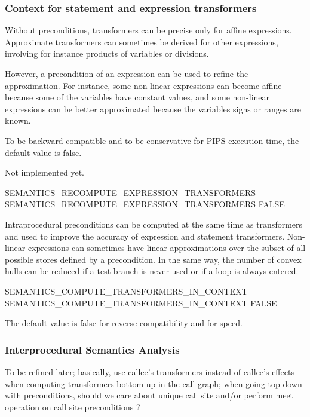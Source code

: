 \documentclass[a4paper]{report}
\begin{document}
\subsubsection{Context for statement and expression transformers}
\index{}

Without preconditions, transformers can be precise only for affine
expressions. Approximate transformers can sometimes be derived for other
expressions, involving for instance products of variables or divisions.

However, a precondition of an expression can be used to refine the
approximation. For instance, some non-linear expressions can become affine
because some of the variables have constant values, and some non-linear
expressions can be better approximated because the variables signs or
ranges are known.

To be backward compatible and to be conservative for PIPS execution time,
the default value is false.

Not implemented yet.

\begin{PipsProp}{SEMANTICS_RECOMPUTE_EXPRESSION_TRANSFORMERS}
SEMANTICS_RECOMPUTE_EXPRESSION_TRANSFORMERS FALSE
\end{PipsProp}

Intraprocedural preconditions can be computed at the same time as
transformers and used to improve the accuracy of expression and statement
transformers. Non-linear expressions can sometimes have linear
approximations over the subset of all possible stores defined by a
precondition. In the same way, the number of convex hulls can be reduced
if a test branch is never used or if a loop is always entered.

\begin{PipsProp}{SEMANTICS_COMPUTE_TRANSFORMERS_IN_CONTEXT}
SEMANTICS_COMPUTE_TRANSFORMERS_IN_CONTEXT FALSE
\end{PipsProp}

The default value is false for reverse compatibility and for speed.

\subsubsection{Interprocedural Semantics Analysis}

To be refined later; basically, use callee's transformers instead of
callee's effects when computing transformers bottom-up in the call graph;
when going top-down with preconditions, should we care about unique
call site and/or perform meet operation on call site preconditions ?
\end{document}
